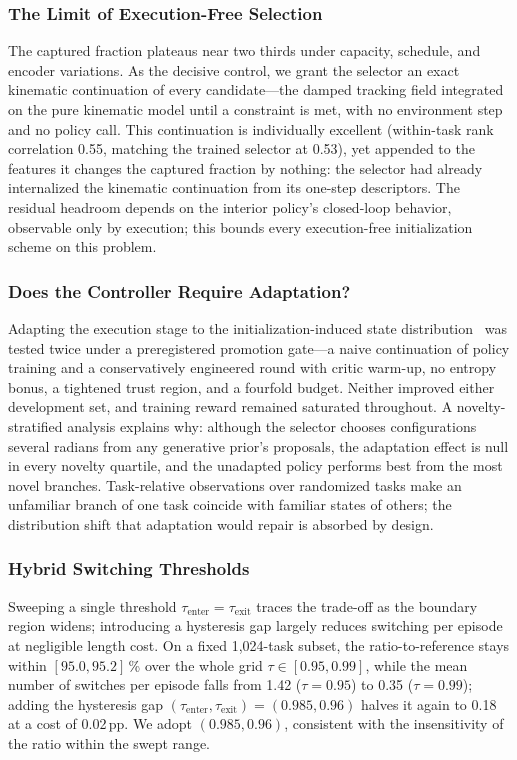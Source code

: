 \documentclass[journal]{IEEEtran}
\begin{document}
\subsubsection{The Limit of Execution-Free Selection}
\label{sec:abl-limit}
The captured fraction plateaus near two thirds under capacity,
schedule, and encoder variations. As the decisive control, we grant the
selector an exact kinematic continuation of every candidate---the
damped tracking field integrated on the pure kinematic model until a
constraint is met, with no environment step and no policy call. This
continuation is individually excellent (within-task rank correlation
0.55, matching the trained selector at 0.53), yet appended to the
features it changes the captured fraction by nothing: the selector had
already internalized the kinematic continuation from its one-step
descriptors. The residual headroom depends on the interior policy's
closed-loop behavior, observable only by execution; this bounds every
execution-free initialization scheme on this problem.

\subsubsection{Does the Controller Require Adaptation?}
\label{sec:abl-fwd}
Adapting the execution stage to the initialization-induced state
distribution~\cite{chen2023sequential} was tested twice under a
preregistered promotion gate---a naive continuation of policy training
and a conservatively engineered round with critic warm-up, no entropy
bonus, a tightened trust region, and a fourfold budget. Neither
improved either development set, and training reward remained saturated
throughout. A novelty-stratified analysis explains why: although the
selector chooses configurations several radians from any generative
prior's proposals, the adaptation effect is null in every novelty
quartile, and the unadapted policy performs best from the most novel
branches. Task-relative observations over randomized tasks make an
unfamiliar branch of one task coincide with familiar states of others;
the distribution shift that adaptation would repair is absorbed by
design.

\subsubsection{Hybrid Switching Thresholds}
Sweeping a single threshold
$\tau_{\mathrm{enter}}{=}\tau_{\mathrm{exit}}$ traces the trade-off as
the boundary region widens; introducing a hysteresis gap largely
reduces switching per episode at negligible length cost. On a fixed 1{,}024-task subset, the
ratio-to-reference stays within $[95.0,95.2]$\,\% over the whole grid
$\tau\in[0.95,0.99]$, while the mean number of switches per episode
falls from 1.42 ($\tau{=}0.95$) to 0.35 ($\tau{=}0.99$); adding the
hysteresis gap $(\tau_{\mathrm{enter}},\tau_{\mathrm{exit}})=
(0.985,0.96)$ halves it again to 0.18 at a cost of 0.02\,pp. We adopt
$(0.985,0.96)$, consistent with the insensitivity of the ratio within
the swept range.
\end{document}
